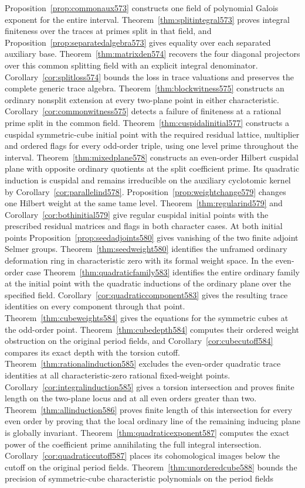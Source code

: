 \documentclass[a4paper,11pt]{article}
\theoremstyle{definition}
\theoremstyle{remark}
\numberwithin{equation}{section}
\begin{document}
Proposition~\ref{prop:commonaux573} constructs one field of polynomial Galois exponent for the entire interval. Theorem~\ref{thm:splitintegral573} proves integral finiteness over the traces at primes split in that field, and Proposition~\ref{prop:separatedalgebra573} gives equality over each separated auxiliary base. Theorem~\ref{thm:matrixden574} recovers the four diagonal projectors over this common splitting field with an explicit integral denominator. Corollary~\ref{cor:splitloss574} bounds the loss in trace valuations and preserves the complete generic trace algebra. Theorem~\ref{thm:blockwitness575} constructs an ordinary nonsplit extension at every two-plane point in either characteristic. Corollary~\ref{cor:commonwitness575} detects a failure of finiteness at a rational prime split in the common field. Theorem~\ref{thm:cuspidalinitial577} constructs a cuspidal symmetric-cube initial point with the required residual lattice, multiplier and ordered flags for every odd-order triple, using one level prime throughout the interval. Theorem~\ref{thm:mixedplane578} constructs an even-order Hilbert cuspidal plane with opposite ordinary quotients at the split coefficient prime. Its quadratic induction is cuspidal and remains irreducible on the auxiliary cyclotomic kernel by Corollary~\ref{cor:parallelind578}. Proposition~\ref{prop:weightchange579} changes one Hilbert weight at the same tame level. Theorem~\ref{thm:regularind579} and Corollary~\ref{cor:bothinitial579} give regular cuspidal initial points with the prescribed residual matrices and flags in both character cases. At both initial points Proposition~\ref{prop:seedadjoints580} gives vanishing of the two finite adjoint Selmer groups. Theorem~\ref{thm:seedweight580} identifies the unframed ordinary deformation ring in characteristic zero with its formal weight space. In the even-order case Theorem~\ref{thm:quadraticfamily583} identifies the entire ordinary family at the initial point with the quadratic inductions of the ordinary plane over the specified field. Corollary~\ref{cor:quadraticcomponent583} gives the resulting trace identities on every component through that point. Theorem~\ref{thm:cubeweights584} gives the equations for the symmetric cubes at the odd-order point. Theorem~\ref{thm:cubedepth584} computes their ordered weight obstruction on the original period fields, and Corollary~\ref{cor:cubecutoff584} compares its exact depth with the torsion cutoff. Theorem~\ref{thm:rationalinduction585} excludes the even-order quadratic trace identities at all characteristic-zero rational fixed-weight points. Corollary~\ref{cor:integralinduction585} gives a torsion intersection and proves finite length on the two-plane locus and at all even orders greater than two. Theorem~\ref{thm:allinduction586} proves finite length of this intersection for every even order by proving that the local ordinary line of the remaining inducing plane is globally invariant. Theorem~\ref{thm:quadraticexponent587} computes the exact power of the coefficient prime annihilating the full integral intersection. Corollary~\ref{cor:quadraticcutoff587} places its cohomological images below the cutoff on the original period fields. Theorem~\ref{thm:unorderedcube588} bounds the precision of symmetric-cube characteristic polynomials on the period fields 
\end{document}
